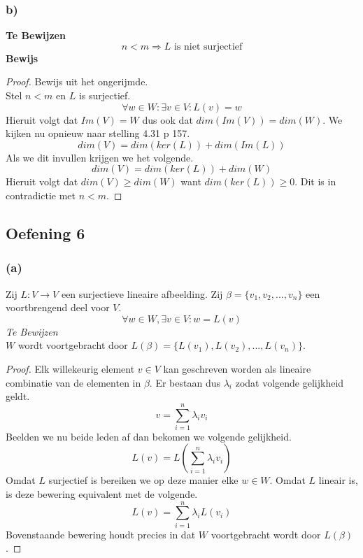 \documentclass[lineaire_algebra_oplossingen.tex]{subfiles}
\begin{document}
\subsubsection*{b)}
\textbf{Te Bewijzen}
\[
n < m \Rightarrow L \text{ is niet surjectief}
\]
\textbf{Bewijs}
\begin{proof}
Bewijs uit het ongerijmde.\\
Stel $n<m$ en $L$ is surjectief.
\[
\forall w\in W:\exists v\in V: L(v)=w
\]
Hieruit volgt dat $Im(V)=W$ dus ook dat $dim(Im(V))=dim(W)$.
We kijken nu opnieuw naar stelling 4.31 p 157.
\[
dim(V) = dim(ker(L)) + dim(Im(L))
\]
Als we dit invullen krijgen we het volgende.
\[
dim(V) = dim(ker(L)) + dim(W)
\]
Hieruit volgt dat $dim(V) \ge dim(W)$ want $dim(ker(L)) \ge 0$. Dit is in contradictie met $n<m$.
\end{proof}


\subsection{Oefening 6}
\subsubsection*{(a)}
Zij $L: V \rightarrow V$ een surjectieve lineaire afbeelding. Zij $\beta = \{v_1,v_2,...,v_n\}$ een voortbrengend deel voor $V$.
\[
\forall w \in W, \exists v \in V: w=L(v)
\]
\emph{Te Bewijzen}\\
$W$ wordt voortgebracht door $L(\beta) = \{L(v_1),L(v_2),...,L(v_n)\}$.
\begin{proof}
Elk willekeurig element $v\in V$ kan geschreven worden als lineaire combinatie van de elementen in $\beta$. Er bestaan dus $\lambda_i$ zodat volgende gelijkheid geldt.
\[
v = \sum_{i=1}^n\lambda_iv_i
\]
Beelden we nu beide leden af dan bekomen we volgende gelijkheid.
\[
L(v) = L\left(\sum_{i=1}^n\lambda_iv_i\right)
\]
Omdat $L$ surjectief is bereiken we op deze manier elke $w\in W$.
Omdat $L$ lineair is, is deze bewering equivalent met de volgende.
\[
L(v) = \sum_{i=1}^n\lambda_iL(v_i)
\]
Bovenstaande bewering houdt precies in dat $W$ voortgebracht wordt door $L(\beta)$.
\end{proof}
\end{document}
